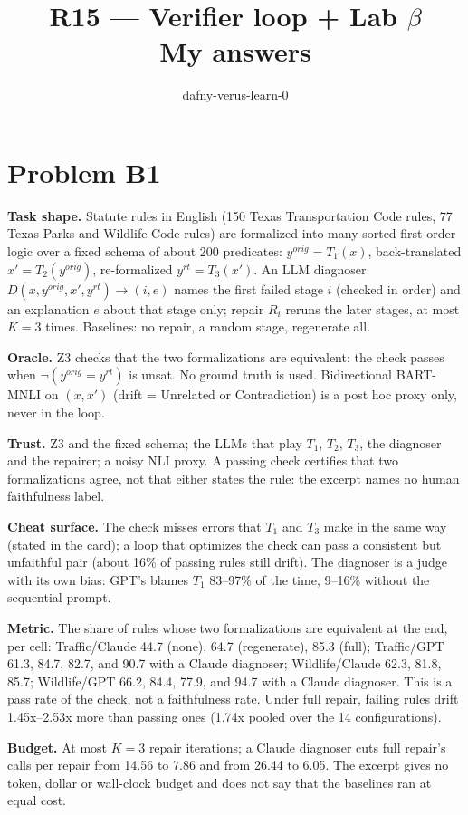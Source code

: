 \documentclass[11pt]{article}
\title{R15 --- Verifier loop + Lab $\beta$ \\ \large My answers}
\author{dafny-verus-learn-0}
\date{}
\begin{document}
\maketitle
\sloppy
\section*{Problem B1}\label{ans:B1}
\begin{answer}
\textbf{Task shape.} Statute rules in English (150 Texas Transportation Code
rules, 77 Texas Parks and Wildlife Code rules) are formalized into many-sorted
first-order logic over a fixed schema of about 200 predicates:
$y^{orig}=T_1(x)$, back-translated $x'=T_2(y^{orig})$, re-formalized
$y^{rt}=T_3(x')$. An LLM diagnoser $D(x,y^{orig},x',y^{rt})\to(i,e)$ names the
first failed stage $i$ (checked in order) and an explanation $e$ about that
stage only; repair $R_i$ reruns the later stages, at most $K=3$ times.
Baselines: no repair, a random stage, regenerate all.

\textbf{Oracle.} Z3 checks that the two formalizations are equivalent: the
check passes when $\neg(y^{orig}=y^{rt})$ is unsat. No ground truth is used.
Bidirectional BART-MNLI on $(x,x')$ (drift = Unrelated or Contradiction) is a
post hoc proxy only, never in the loop.

\textbf{Trust.} Z3 and the fixed schema; the LLMs that play $T_1$, $T_2$,
$T_3$, the diagnoser and the repairer; a noisy NLI proxy. A passing check
certifies that two formalizations agree, not that either states the rule: the
excerpt names no human faithfulness label.

\textbf{Cheat surface.} The check misses errors that $T_1$ and $T_3$ make in
the same way (stated in the card); a loop that optimizes the check can pass a
consistent but unfaithful pair (about 16\% of passing rules still drift). The
diagnoser is a judge with its own bias: GPT's blames $T_1$ 83--97\% of the
time, 9--16\% without the sequential prompt.

\textbf{Metric.} The share of rules whose two formalizations are equivalent at
the end, per cell: Traffic/Claude 44.7 (none), 64.7 (regenerate), 85.3 (full);
Traffic/GPT 61.3, 84.7, 82.7, and 90.7 with a Claude diagnoser;
Wildlife/Claude 62.3, 81.8, 85.7; Wildlife/GPT 66.2, 84.4, 77.9, and 94.7 with
a Claude diagnoser. This is a pass rate of the check, not a faithfulness rate.
Under full repair, failing rules drift 1.45x--2.53x more than passing ones
(1.74x pooled over the 14 configurations).

\textbf{Budget.} At most $K=3$ repair iterations; a Claude diagnoser cuts
full repair's calls per repair from 14.56 to 7.86 and from 26.44 to 6.05. The
excerpt gives no token, dollar or wall-clock budget and does not say that the
baselines ran at equal cost.


\end{answer}
\end{document}
